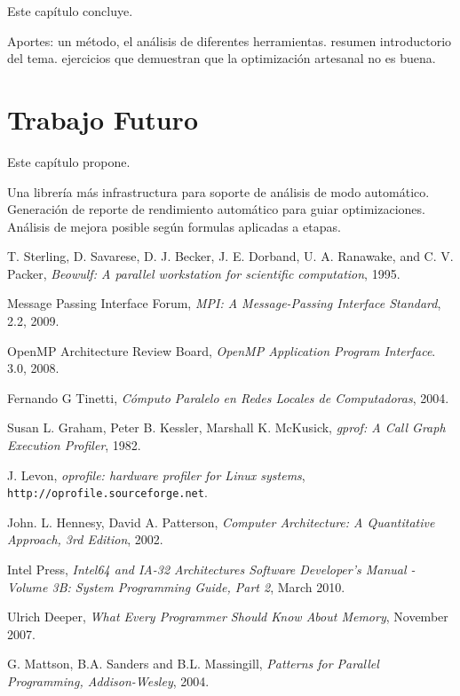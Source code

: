 \documentclass[a4paper]{report}
\begin{document}
Este cap\'itulo concluye.

Aportes: un m\'etodo, el an\'alisis de diferentes herramientas. resumen
introductorio del tema. ejercicios que demuestran que la optimizaci\'on artesanal
no es buena.

\chapter{Trabajo Futuro}

Este cap\'itulo propone.

Una librer\'ia m\'as infrastructura para soporte de an\'alisis de modo autom\'atico.
Generaci\'on de reporte de rendimiento autom\'atico para guiar optimizaciones.
An\'alisis de mejora posible seg\'un formulas aplicadas a etapas.

\begin{thebibliography}{9}

  T. Sterling, D. Savarese, D. J. Becker, J. E. Dorband, U. A. Ranawake, and C. V. Packer,
  \emph{Beowulf: A parallel workstation for scientific computation},
  1995.

  Message Passing Interface Forum,
  \emph{MPI: A Message-Passing Interface Standard},
  2.2,
  2009.

  OpenMP Architecture Review Board,
  \emph{OpenMP Application Program Interface}.
  3.0,
  2008.

  Fernando G Tinetti,
  \emph{C\'omputo Paralelo en Redes Locales de Computadoras},
  2004.

  Susan L. Graham,  Peter B. Kessler,  Marshall K. McKusick,
  \emph{gprof: A Call Graph Execution Profiler},
  1982.
  
  J. Levon,
  \emph{oprofile: hardware profiler for Linux systems}, {\tt http://oprofile.sourceforge.net}.
  
  John. L. Hennesy, David A. Patterson,
  \emph{Computer Architecture: A Quantitative Approach, 3rd Edition},
  2002.

  Intel Press,
  \emph{Intel64 and IA-32 Architectures Software Developer's Manual - Volume 3B: System Programming Guide, Part 2},
  March 2010.

  Ulrich Deeper,
  \emph{What Every Programmer Should Know About Memory},
  November 2007.

  G. Mattson, B.A. Sanders and B.L. Massingill, 
  \emph{Patterns for Parallel Programming, Addison-Wesley},
  2004.
  

\end{thebibliography}
\end{document}
